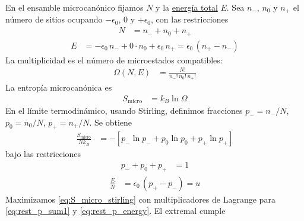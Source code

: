 \documentclass{article}
\begin{document}
En el ensamble microcanónico fijamos $N$ y la \underline{energía total} $E$. Sea $n_{-}$, $n_0$ y $n_{+}$ el número de sitios ocupando $-\epsilon_0$, $0$ y $+\epsilon_0$, con las restricciones
\begin{equation}
\begin{split}
N
&= n_{-}+n_0+n_{+}
\end{split}\label{eq:restric_N}
\end{equation}
\begin{equation}
\begin{split}
E
&= -\epsilon_0\,n_{-} + 0\cdot n_0 + \epsilon_0\,n_{+}
= \epsilon_0\,(n_{+}-n_{-})
\end{split}\label{eq:restric_E}
\end{equation}
La multiplicidad es el número de microestados compatibles:
\begin{equation}
\begin{split}
\Omega(N,E)
&= \frac{N!}{n_{-}!\,n_{0}!\,n_{+}!}
\end{split}\label{eq:Omega_multinomial}
\end{equation}
La entropía microcanónica es
\begin{equation}
\begin{split}
S_{\text{micro}}
&= k_B\ln\Omega
\end{split}\label{eq:S_micro_def}
\end{equation}
En el límite termodinámico, usando Stirling, definimos fracciones $p_{-}=n_{-}/N$, $p_0=n_0/N$, $p_{+}=n_{+}/N$. Se obtiene
\begin{equation}
\begin{split}
\frac{S_{\text{micro}}}{N k_B}
&= -\left[p_{-}\ln p_{-} + p_0\ln p_0 + p_{+}\ln p_{+}\right]
\end{split}\label{eq:S_micro_stirling}
\end{equation}
bajo las restricciones
\begin{equation}
\begin{split}
p_{-}+p_0+p_{+}
&= 1
\end{split}\label{eq:rest_p_sum1}
\end{equation}
\begin{equation}
\begin{split}
\frac{E}{N}
&= \epsilon_0\,(p_{+}-p_{-})
= u
\end{split}\label{eq:rest_p_energy}
\end{equation}
Maximizamos \eqref{eq:S_micro_stirling} con multiplicadores de Lagrange para \eqref{eq:rest_p_sum1} y \eqref{eq:rest_p_energy}. El extremal cumple
\end{document}
